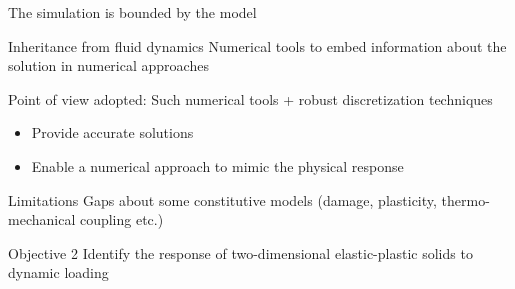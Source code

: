 \begin{frame}{The simulation is bounded by the model}
  \begin{block}{Inheritance from fluid dynamics}
    Numerical tools to embed information about the solution in numerical approaches
  \end{block}
  \begin{block}{Point of view adopted: Such numerical tools + robust discretization techniques}
    \begin{itemize}
    \item Provide accurate solutions
    \item Enable a numerical approach to mimic the physical response
    \end{itemize}
  \end{block}
  \begin{block}{Limitations}
    Gaps about some constitutive models (damage, plasticity, thermo-mechanical coupling etc.)
  \end{block}
  \begin{block}{Objective 2}
    Identify the response of two-dimensional elastic-plastic solids to dynamic loading
  \end{block}
\end{frame}



